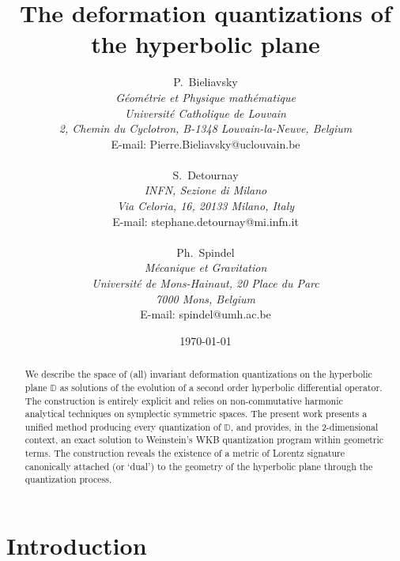 \documentclass{article}
\newcommand{\DD}{\mathbb D}
\begin{document}
\title{The deformation quantizations of the hyperbolic plane}

 

 \author{P.~Bieliavsky \\{\it G\'eom\'etrie et Physique math\'ematique}\\ {\it
         Universit\'e Catholique de Louvain}\\ {\it
         2, Chemin du Cyclotron, B-1348 Louvain-la-Neuve, Belgium}\\ E-mail:
           {Pierre.Bieliavsky@uclouvain.be}
\\           
\\ S.~Detournay
         \\{\it INFN, Sezione di Milano}\\ {\it Via Celoria, 16, 20133 Milano, Italy}\\E-mail:
            {stephane.detournay@mi.infn.it}  
\\
\\  Ph.~Spindel \\{\it M\'ecanique et Gravitation}\\ {\it Universit\'e de Mons-Hainaut, 20
         Place du Parc}\\ {\it 7000 Mons, Belgium}\\E-mail:
		  {spindel@umh.ac.be}
		}

                  
          \date{\today}
\maketitle

\begin{abstract}
We describe the space of (all) invariant deformation quantizations on the hyperbolic plane $\DD$ as 
solutions of the evolution of a second order hyperbolic differential operator. The construction is entirely explicit
and relies on non-commutative harmonic analytical techniques on symplectic symmetric spaces. The present work 
presents a unified method producing every quantization of $\DD$, and provides, in the 2-dimensional context, an exact solution to Weinstein's WKB quantization program within geometric terms. The construction reveals the existence of a metric of Lorentz signature canonically attached (or `dual') to the geometry of the hyperbolic plane through the quantization  process.
\end{abstract}
\section{Introduction}\label{Intro}
\end{document}
